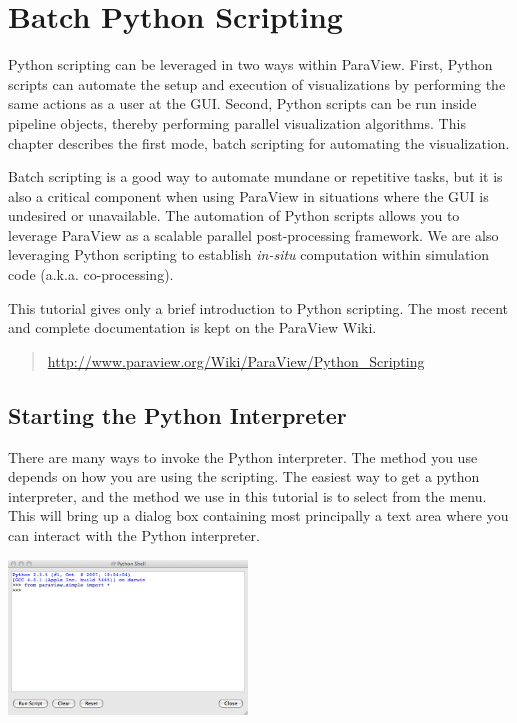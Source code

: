 \chapter{Batch Python Scripting}
\label{chap:BatchPythonScripting}

Python scripting can be leveraged in two ways within ParaView.  First,
Python scripts can automate the setup and execution of visualizations by
performing the same actions as a user at the GUI.  Second, Python scripts
can be run inside pipeline objects, thereby performing parallel
visualization algorithms.  This chapter describes the first mode, batch
scripting for automating the visualization.

Batch scripting is a good way to automate mundane or repetitive tasks, but
it is also a critical component when using ParaView in situations where the
GUI is undesired or unavailable.  The automation of Python scripts allows
you to leverage ParaView as a scalable parallel post-processing framework.
We are also leveraging Python scripting to establish \emph{in-situ}
computation within simulation code (a.k.a. co-processing).

This tutorial gives only a brief introduction to Python scripting.  The
most recent and complete documentation is kept on the ParaView Wiki.

\begin{quote}
  \href{http://www.paraview.org/Wiki/ParaView/Python_Scripting}{http://www.paraview.org/Wiki/ParaView/Python\_Scripting}
\end{quote}

\section{Starting the Python Interpreter}
\label{sec:StartingThePythonInterpreter}

There are many ways to invoke the Python interpreter.  The method you use
depends on how you are using the scripting.  The easiest way to get a
python interpreter, and the method we use in this tutorial is to select
 \ra {} from the menu.  This will bring up a
dialog box containing most principally a text area where you can interact
with the Python interpreter.

\begin{inlinefig}
  \includegraphics[width=2.5in]{images/PythonShellDialog}
\end{inlinefig}

